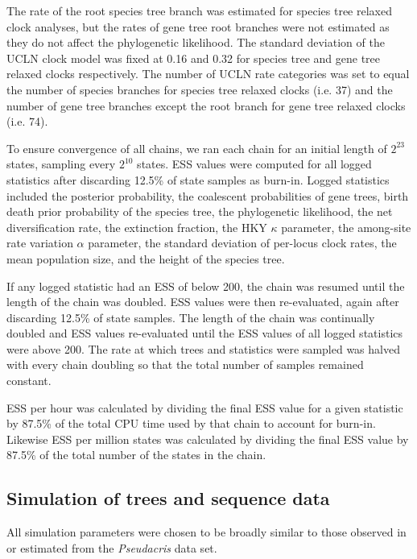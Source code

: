 \documentclass[12pt]{article}
\begin{document}
The rate of the root species tree branch was estimated for species tree relaxed
clock analyses, but the rates of gene tree root branches were not estimated as
they do not affect the phylogenetic likelihood. The standard deviation of the
UCLN clock model was fixed at 0.16 and 0.32 for species tree and gene tree
relaxed clocks respectively. The number of UCLN rate categories was set to equal
the number of species branches for species tree relaxed clocks (i.e. 37)
and the number of gene tree branches except the root branch for gene tree
relaxed clocks (i.e. 74).

To ensure convergence of all chains, we ran each chain for an initial length of
$2^{23}$ states, sampling every $2^{10}$ states. ESS values were computed for
all logged statistics after discarding 12.5\% of state samples as burn-in. Logged
statistics included the posterior probability, the
coalescent probabilities of gene trees, birth death prior
probability of the species tree, the phylogenetic likelihood, the net
diversification rate, the extinction fraction, the HKY $\kappa$ parameter, the
among-site rate variation $\alpha$ parameter, the standard deviation of
per-locus clock rates, the mean population size, and the height of the species tree.

If any logged statistic had an ESS of below 200, the chain was resumed until the
length of the chain was doubled. ESS values were then re-evaluated, again after
discarding 12.5\% of state samples. The length of the chain was continually
doubled and ESS values re-evaluated until the ESS values of all logged
statistics were above 200. The rate at which trees and statistics were sampled
was halved with every chain doubling so that the total number of samples
remained constant.

ESS per hour was calculated by dividing the final ESS value for a given
statistic by 87.5\% of the total CPU time used by that chain to account for
burn-in. Likewise ESS per million states was calculated by dividing the final ESS
value by 87.5\% of the total number of the states in the chain.

\subsection*{Simulation of trees and sequence data}

All simulation parameters were chosen to be broadly similar to those observed in
or estimated from the \textit{Pseudacris} data set.
\end{document}
